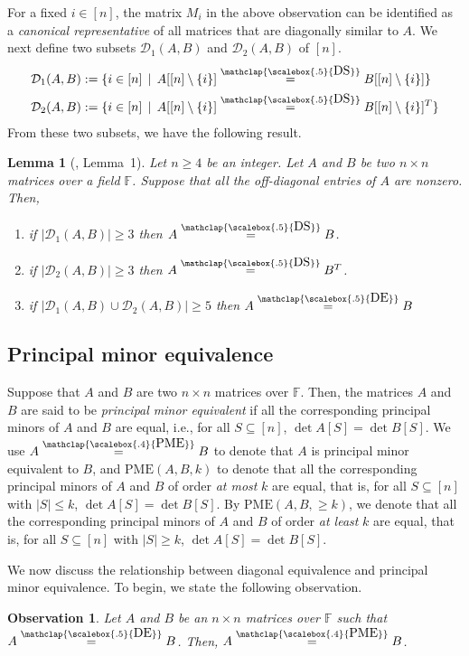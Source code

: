 \documentclass[11pt,letterpaper]{article}
\newcommand{\F}{\mathbb{F}}
\newtheorem{lemma}{Lemma}[section]
\newtheorem{observation}{Observation}[section]
\newcommand{\DS}{\stackrel{\mathclap{\scalebox{.5}{\mbox{DS}}}}{=}}
\newcommand{\DE}{\stackrel{\mathclap{\scalebox{.5}{\mbox{DE}}}}{=}}
\newcommand{\PME}{\stackrel{\mathclap{\scalebox{.4}{\mbox{PME}}}}{=}}
\newcommand{\kPME}[3]{\mathrm{PME}(#1, #2, #3)}
\newcommand{\newPME}[4]{\mathrm{PME}(#1, #4, #2#3)}
\newcommand{\nsubset}[1]{[n]\setminus\{#1\}}
\newcommand{\calD}{\mathcal{D}}
\begin{document}
{{{For a fixed $i\in[n]$, the matrix $M_i$ in the above observation can be identified as a \emph{canonical representative} of all matrices that are diagonally similar to $A$. We next define two subsets $\calD_1(A, B)$ and $\calD_2(A, B)$ of $[n]$.
\begin{align}
\calD_1(A,B) &:= \{i\in[n]\,\mid\, A[\nsubset{i}] \DS B[\nsubset{i}]\}\label{eqn:ds-one}\\
\calD_2(A,B) &:= \{i\in[n]\,\mid\, A[\nsubset{i}]\DS B[\nsubset{i}]^T\}\label{eqn:ds-two}
\end{align}
From these two subsets, we have the following result.
\begin{lemma}[\cite{Hartfiell84}, Lemma~1]
\label{lem:partial-DS-to-complete-DS}
Let $n\geq 4$ be an integer. Let $A$ and $B$ be two $n\times n$ matrices over a field $\F$. Suppose that all the off-diagonal entries of $A$ are nonzero. Then, 
\begin{enumerate}
\item if $|\calD_1(A,B)|\geq 3$ then $A\DS B$.
\item if $|\calD_2(A,B)|\geq 3$ then $A\DS B^T$.
\item if $|\calD_1(A,B)\cup\calD_2(A,B)|\geq 5$ then $A\DE B$
\end{enumerate}
\end{lemma}



\subsection{Principal minor equivalence}
Suppose that $A$ and $B$ are two $n\times n$ matrices over $\F$. Then, the matrices $A$ and $B$ are said to be \emph{principal minor equivalent} if all the corresponding principal minors of $A$ and $B$ are equal, i.e., for all $S\subseteq [n]$, $\det A[S]=\det B[S]$. We use $A\PME B$ to denote that $A$ is principal minor equivalent to $B$, and $\kPME{A}{B}{k}$ to denote that all the corresponding principal minors of $A$ and $B$ of order \emph{at most} $k$ are equal, that is, for all $S\subseteq [n]$ with $|S|\leq k$, $\det A[S]=\det B[S]$. By $\newPME{A}{\geq}{k}{B}$, we denote that all the corresponding principal minors of $A$ and $B$ of order \emph{at least} $k$ are equal, that is, for all $S\subseteq [n]$ with $|S|\geq k$, $\det A[S]=\det B[S]$.

We now discuss the relationship between diagonal equivalence and principal minor equivalence. To begin, we state the following observation.
\begin{observation}
\label{obs:DE-to-PME}
Let $A$ and $B$ be an $n\times n$ matrices over $\F$ such that $A\DE B$. Then, $A\PME B$. 
\end{observation}

}}}
\end{document}
